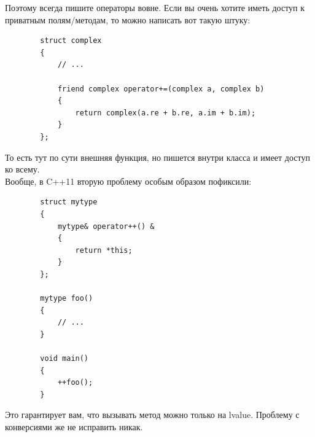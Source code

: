 \documentclass{article}
\begin{document}
    Поэтому всегда пишите операторы вовне. Если вы очень хотите иметь доступ к приватным полям/методам, то можно написать вот такую штуку:
    \begin{verbatim}
        struct complex
        {
            // ...

            friend complex operator+=(complex a, complex b)
            {
                return complex(a.re + b.re, a.im + b.im);
            }
        };
    \end{verbatim}
    То есть тут по сути внешняя функция, но пишется внутри класса и имеет доступ ко всему.\\
    Вообще, в C++11 вторую проблему особым образом пофиксили:
    \begin{verbatim}
        struct mytype
        {
            mytype& operator++() &
            {
                return *this;
            }
        };
        
        mytype foo()
        {
            // ...
        }
        
        void main()
        {
            ++foo();
        }
    \end{verbatim}
    Это гарантирует вам, что вызывать метод можно только на lvalue. Проблему с конверсиями же не исправить никак.
\end{document}

